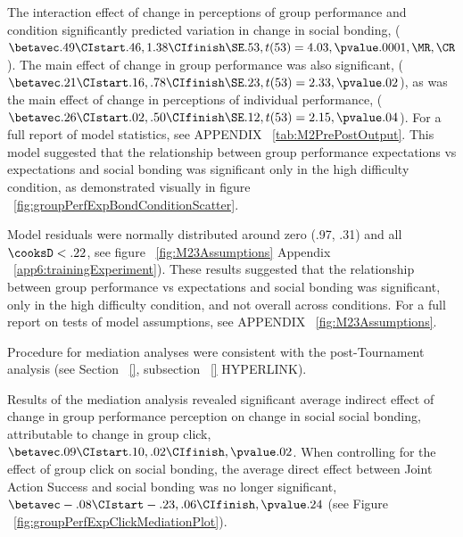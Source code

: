 The interaction effect of change in perceptions of group performance and condition significantly predicted variation in change in social bonding, ($\betavec .49 \CIstart .46, 1.38  \CIfinish \SE .53, t(53) = 4.03, \pvalue .0001, \MR , \CR $). The main effect of change in group performance was also significant, ($\betavec .21  \CIstart .16, .78 \CIfinish \SE.23, t(53) = 2.33, \pvalue .02$), as was the main effect of change in perceptions of individual performance, ($\betavec .26  \CIstart .02, .50 \CIfinish \SE.12, t(53) = 2.15, \pvalue .04$).
For a full report of model statistics, see APPENDIX ~\ref{tab:M2PrePostOutput}.  This model suggested that the relationship between group performance expectations vs expectations and social bonding was significant only in the high difficulty condition, as demonstrated visually in figure ~\ref{fig:groupPerfExpBondConditionScatter}.

Model residuals were normally distributed around zero (\resdist .97, \pvalue .31) and all $\cooksD < .22$, see figure ~\ref{fig:M23Assumptions} Appendix ~\ref{app6:trainingExperiment}).  These results suggested that the relationship between  group performance vs expectations and social bonding was significant, only in the high difficulty condition, and not overall across conditions. For a full report on tests of model assumptions, see APPENDIX ~\ref{fig:M23Assumptions}.













Procedure for mediation analyses were consistent with the post-Tournament analysis (see Section ~\ref{}, subsection ~\ref{} HYPERLINK).

Results of the mediation analysis revealed significant average indirect effect of change in group performance perception on change in social social bonding, attributable to change in group click, $\betavec.09 \CIstart .10, .02  \CIfinish, \pvalue .02$.  When controlling for the effect of group click on social bonding, the average direct effect between Joint Action Success and social bonding was no longer significant, $\betavec -.08  \CIstart -.23, .06 \CIfinish, \pvalue .24$  (see Figure ~\ref{fig:groupPerfExpClickMediationPlot}).

